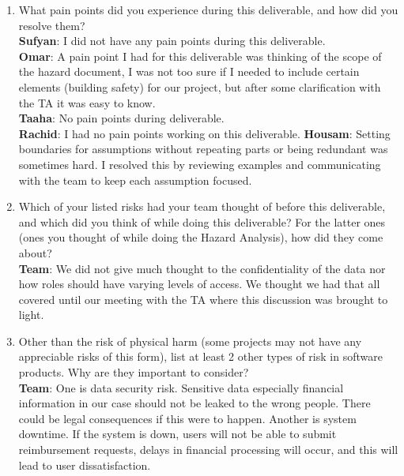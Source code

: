 \documentclass{article}
\begin{document}
\begin{enumerate}
    \item What pain points did you experience during this deliverable, and how
    did you resolve them? \\
    \textbf{Sufyan}: I did not have any pain points during this deliverable. \\
    \textbf{Omar}: A pain point I had for this deliverable was thinking of the scope of the hazard document, I was not too sure if I needed to include certain elements (building safety) for our project, but after some clarification with the TA it was easy to know.  \\
    \textbf{Taaha}: No pain points during deliverable.  \\
    \textbf{Rachid}: I had no pain points working on this deliverable. 
    \textbf{Housam}: Setting boundaries for assumptions without repeating parts or being redundant was sometimes hard. I resolved this by reviewing examples and communicating with the team to keep each assumption focused.
    \item Which of your listed risks had your team thought of before this
    deliverable, and which did you think of while doing this deliverable? For
    the latter ones (ones you thought of while doing the Hazard Analysis), how
    did they come about? \\
    \textbf{Team}: We did not give much thought to the confidentiality of the data nor how roles should have varying levels of access. We thought we had that all covered until our meeting with the TA where this discussion was brought to light.
    \item Other than the risk of physical harm (some projects may not have any
    appreciable risks of this form), list at least 2 other types of risk in
    software products. Why are they important to consider? \\
    \textbf{Team}: One is data security risk. Sensitive data especially financial information in our case should not be leaked to the wrong people. There could be legal consequences if this were to happen. Another is system downtime. If the system is down, users will not be able to submit reimbursement requests, delays in financial processing will occur, and this will lead to user dissatisfaction.
\end{enumerate}
\end{document}
